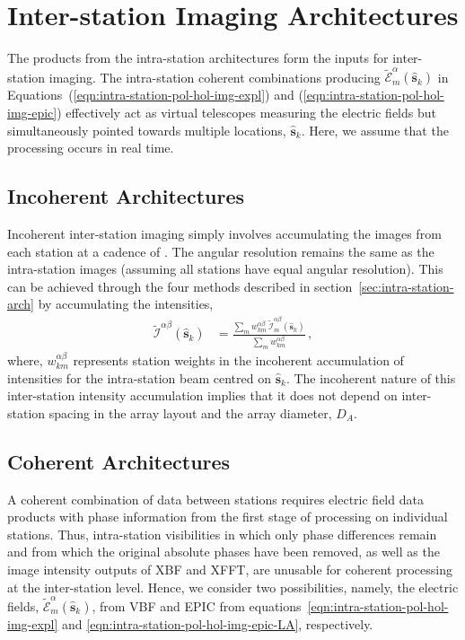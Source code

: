 \documentclass[
  journal=pasa,
  manuscript=article-type,
  year=2020,
  volume=37,
]{cup-journal}
\begin{document}
\section{Inter-station Imaging Architectures} \label{sec:inter-station-arch}

The products from the intra-station architectures form the inputs for inter-station imaging. The intra-station coherent combinations producing $\widetilde{\mathcal{E}}_m^\alpha(\hat{\boldsymbol{s}}_k)$ in Equations~(\ref{eqn:intra-station-pol-hol-img-expl}) and (\ref{eqn:intra-station-pol-hol-img-epic}) effectively act as virtual telescopes measuring the electric fields but simultaneously pointed towards multiple locations, $\hat{\boldsymbol{s}}_k$. Here, we assume that the processing occurs in real time. 

\subsection{Incoherent Architectures} \label{sec:incoherent}

Incoherent inter-station imaging simply involves accumulating the images from each station at a cadence of . The angular resolution remains the same as the intra-station images (assuming all stations have equal angular resolution). This can be achieved through the four methods described in section~\ref{sec:intra-station-arch} by accumulating the intensities, 
\begin{align}
    \widetilde{\mathcal{I}}^{\alpha\beta}(\hat{\boldsymbol{s}}_k) &= \frac{\sum_m w_{km}^{\alpha\beta} \, \widetilde{\mathcal{I}}_m^{\alpha\beta}(\hat{\boldsymbol{s}}_k)}{\sum_m w_{km}^{\alpha\beta}} \, , \label{eqn:inter-station-incoherent-pol-images}
\end{align}
where, $w_{km}^{\alpha\beta}$ represents station weights in the incoherent accumulation of intensities for the intra-station beam centred on $\hat{\boldsymbol{s}}_k$. The incoherent nature of this inter-station intensity accumulation implies that it does not depend on inter-station spacing in the array layout and the array diameter, $D_A$. 

\subsection{Coherent Architectures} \label{sec:coherent}

A coherent combination of data between stations requires electric field data products with phase information from the first stage of processing on individual stations. Thus, intra-station visibilities in which only phase differences remain and from which the original absolute phases have been removed, as well as the image intensity outputs of XBF and XFFT, are unusable for coherent processing at the inter-station level. Hence, we consider two possibilities, namely, the electric fields, $\widetilde{\mathcal{E}}_m^\alpha(\hat{\boldsymbol{s}}_k)$, from VBF and EPIC from equations~\ref{eqn:intra-station-pol-hol-img-expl} and \ref{eqn:intra-station-pol-hol-img-epic-LA}, respectively. 
\end{document}
